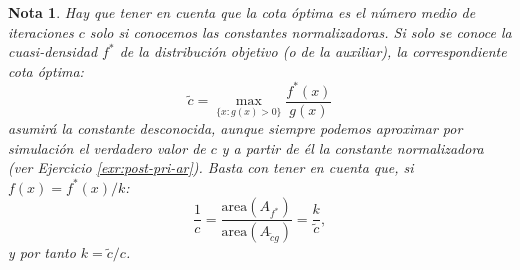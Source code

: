 \documentclass[
  10pt,
]{book}
\theoremstyle{break}
\theoremstyle{nonumberplain}
\newtheorem{remark}{Nota}
\begin{document}
\begin{remark}
Hay que tener en cuenta que la cota óptima es el número medio de iteraciones \(c\) solo si conocemos las constantes normalizadoras.
Si solo se conoce la cuasi-densidad \(f^{\ast}\) de la distribución objetivo (o de la auxiliar), la correspondiente cota óptima:
\[\tilde{c} = \max_{\{x : g(x) > 0\}} \frac{f^{\ast}(x)}{g(x)}\]
asumirá la constante desconocida, aunque siempre podemos aproximar por simulación el verdadero valor de \(c\) y a partir de él la constante normalizadora (ver Ejercicio \ref{exr:post-pri-ar}).
Basta con tener en cuenta que, si \(f(x) = f^{\ast}(x)/k\):
\[\frac{1}{c} = \frac{\text{area}\left(A_{f^{\ast}}\right)}{\text{area}\left( A_{\tilde{c}g}\right)} = \frac{k}{\tilde{c}},\]
y por tanto \(k= \tilde{c}/c\).
\end{remark}
\end{document}
